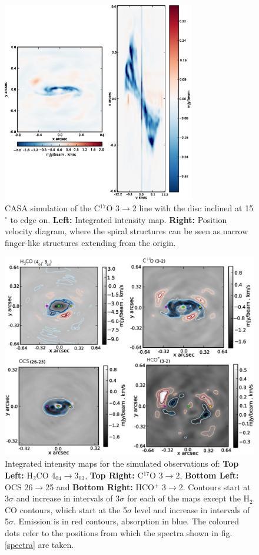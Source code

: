 \documentclass[useAMS,usenatbib]{mn2e}
\begin{document}
\begin{figure}
 \includegraphics[width=84mm]{Figures/sim/fig12.eps}

 \caption{CASA simulation of the C$^{17}$O 3$\rightarrow$2 line with the disc inclined at 15$^\circ$ to edge on. {\bf Left:} Integrated intensity map. {\bf Right:} Position velocity diagram, where the spiral structures can be seen as narrow finger-like structures extending from the origin.}
 \label{15deg}
\end{figure}


\begin{figure}
 \includegraphics[width=140mm]{Figures/sim/fig13.eps}
 \caption{Integrated intensity maps for the simulated observations of: {\bf Top Left:} H$_2$CO 4$_{04}\rightarrow$3$_{03}$, {\bf Top Right:} C$^{17}$O 3$\rightarrow$2, {\bf Bottom Left:} OCS 26$\rightarrow$25 and {\bf Bottom Right:} HCO$^+$ 3$\rightarrow$2. Contours start at 3$\sigma$ and increase in intervals of 3$\sigma$ for each of the maps except the H$_2$CO contours, which start at the 5$\sigma$ level and increase in intervals of 5$\sigma$. Emission is in red contours, absorption in blue. The coloured dots refer to the positions from which the spectra shown in fig. \ref{spectra} are taken.}
\label{mom0_maps}
\end{figure}
\end{document}
